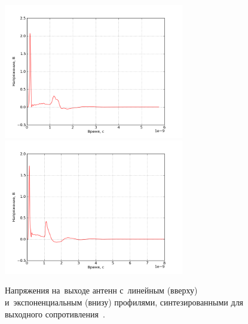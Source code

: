 \begin{figure}[p]
\centering
\includegraphics[width=0.7\textwidth]{graphics/directional-patterns-reply-linear-U}
\includegraphics[width=0.7\textwidth]{graphics/directional-patterns-reply-exponential-U}
\caption{
    Напряжения на~выходе антенн с~линейным (вверху) и~экспоненциальным (внизу)
    профилями, синтезированными для выходного сопротивления~.}
\label{fig:ReplyVoltages377}
\end{figure}

